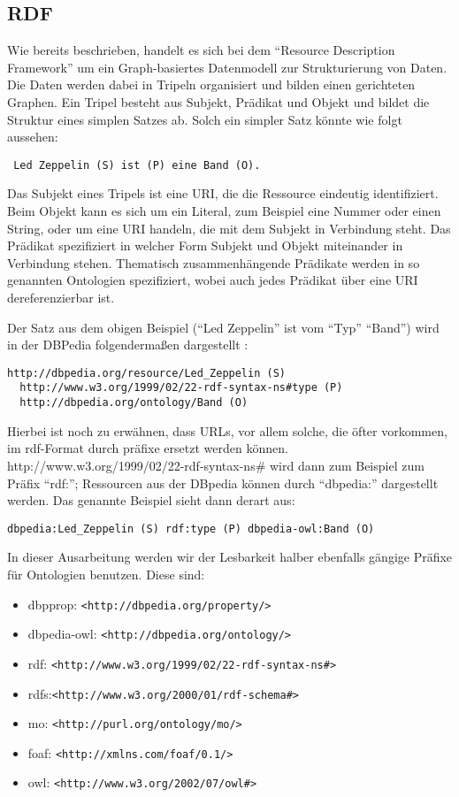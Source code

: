 \subsection{RDF}

Wie bereits beschrieben, handelt es sich bei dem “Resource Description Framework” um ein Graph-basiertes Datenmodell zur Strukturierung von Daten. Die Daten werden dabei in Tripeln organisiert und bilden einen gerichteten Graphen. Ein Tripel besteht aus Subjekt, Prädikat und Objekt und bildet die Struktur eines simplen Satzes ab. Solch ein simpler Satz könnte wie folgt aussehen:

\begin{lstlisting}
 Led Zeppelin (S) ist (P) eine Band (O).
\end{lstlisting}


Das Subjekt eines Tripels ist eine URI, die die Ressource eindeutig identifiziert. Beim Objekt kann es sich um ein Literal, zum Beispiel eine Nummer oder einen String, oder um eine URI handeln, die mit dem Subjekt in Verbindung steht. Das Prädikat spezifiziert in welcher Form Subjekt und Objekt miteinander in Verbindung stehen. Thematisch zusammenhängende Prädikate werden in so genannten Ontologien spezifiziert, wobei auch jedes Prädikat über eine URI dereferenzierbar ist.

Der Satz aus dem obigen Beispiel (“Led Zeppelin” ist vom “Typ” “Band”) wird in der DBPedia folgendermaßen dargestellt \cite{dbpedia_led_zeppelin}:

\begin{lstlisting}
http://dbpedia.org/resource/Led_Zeppelin (S) 
  http://www.w3.org/1999/02/22-rdf-syntax-ns#type (P)
  http://dbpedia.org/ontology/Band (O)
\end{lstlisting}

Hierbei ist noch zu erwähnen, dass URLs, vor allem solche, die öfter vorkommen, im rdf-Format durch präfixe ersetzt werden können. http://www.w3.org/1999/02/22-rdf-syntax-ns\# wird dann zum Beispiel zum Präfix “rdf:”; Ressourcen aus der DBpedia können durch “dbpedia:” dargestellt werden.
Das genannte Beispiel sieht dann derart aus:

\begin{lstlisting}
dbpedia:Led_Zeppelin (S) rdf:type (P) dbpedia-owl:Band (O)
\end{lstlisting}

In dieser Ausarbeitung werden wir der Lesbarkeit halber ebenfalls gängige Präfixe für Ontologien benutzen. Diese sind:
\begin{itemize}
\item dbpprop: \tt <http://dbpedia.org/property/>
\item dbpedia-owl: \tt <http://dbpedia.org/ontology/>
\item rdf: \tt <http://www.w3.org/1999/02/22-rdf-syntax-ns\#>
\item rdfs:\tt <http://www.w3.org/2000/01/rdf-schema\#>
\item mo: \tt <http://purl.org/ontology/mo/>
\item foaf: \tt <http://xmlns.com/foaf/0.1/>
\item owl: \tt <http://www.w3.org/2002/07/owl\#>
\end{itemize}


